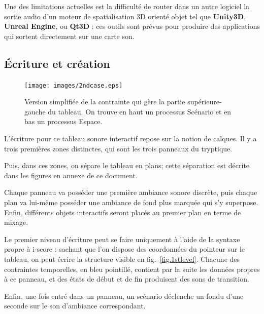 \documentclass{article}
\begin{document}
    Une des limitations actuelles est la difficulté de router dans un autre logiciel la sortie audio d'un moteur de spatialisation 3D orienté objet tel que \textbf{Unity3D}, \textbf{Unreal Engine}, ou \textbf{Qt3D} : ces outils sont prévus pour produire des applications qui sortent directement sur une carte son.
    
    \subsection*{Écriture et création}
    \begin{figure}[h]
        \centering
        
        \texttt{[image: images/2ndcase.eps]}
        \caption{Version simplifiée de la contrainte qui gère la partie supérieure-gauche du tableau. On trouve en haut un processus Scénario et en bas un processus Espace.}
        \label{fig.2ndcase}
    \end{figure}
    L'écriture pour ce tableau sonore interactif repose sur la notion de calques.
    Il y a trois premières zones distinctes, qui sont les trois panneaux du tryptique.
    
    Puis, dans ces zones, on sépare le tableau en plans; cette séparation est décrite dans les figures en annexe de ce document.
    
    Chaque panneau va posséder une première ambiance sonore discrète, puis chaque plan va lui-même 
    posséder une ambiance de fond plus marquée qui s'y superpose.
    Enfin, différents objets interactifs seront placés au premier plan en terme de mixage.
    
    
    Le premier niveau d'écriture peut se faire uniquement à l'aide de la syntaxe propre à i-score : 
    sachant que l'on dispose des coordonnées du pointeur sur le tableau, on peut écrire la structure visible en fig.~\ref{fig.1stlevel}.
    Chacune des contraintes temporelles, en bleu pointillé, contient par la suite les données propres à ce panneau, et des états de début et de fin produisent des sons de transition.
    
    Enfin, une fois entré dans un panneau, un scénario déclenche un fondu d'une seconde sur le son d'ambiance correspondant.
    
\end{document}
